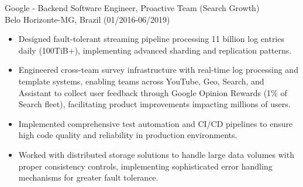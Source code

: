 
\normalsize{Google - Backend Software Engineer, Proactive Team (Search Growth)}\\
        \scriptsize{Belo Horizonte-MG, Brazil (01/2016-06/2019)}
\begin{itemize}
    \item \scriptsize{Designed fault-tolerant streaming pipeline processing 11 billion log entries daily (100TiB+), implementing advanced sharding and replication patterns.}

    \item \scriptsize{Engineered cross-team survey infrastructure with real-time log processing and template systems, enabling teams across YouTube, Geo, Search, and Assistant to collect user feedback through Google Opinion Rewards (1\% of Search fleet), facilitating product improvements impacting millions of users.}
    
    \item \scriptsize{Implemented comprehensive test automation and CI/CD pipelines to ensure high code quality and reliability in production environments.}

    \item \scriptsize{Worked with distributed storage solutions to handle large data volumes with proper consistency controls, implementing sophisticated error handling mechanisms for greater fault tolerance.}

\end{itemize}